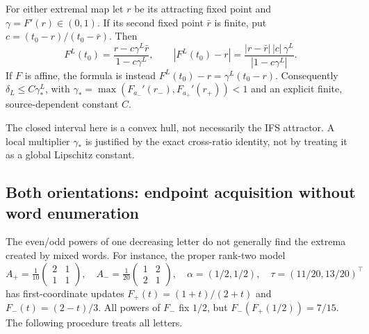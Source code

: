 \begin{corollary}
\label{II:U:cor:rank-two-cross-ratio}
For either extremal map let $r$ be its attracting fixed point and
$\gamma=F'(r)\in(0,1)$. If its second fixed point $\bar r$ is finite,
put $c=(t_0-r)/(t_0-\bar r)$. Then
\begin{equation}
 F^L(t_0)=\frac{r-c\gamma^L\bar r}{1-c\gamma^L},
 \qquad
 |F^L(t_0)-r|
 =\frac{|r-\bar r|\,|c|\,\gamma^L}{|1-c\gamma^L|}.
 \label{II:U:eq:rank-two-cross-ratio}
\end{equation}
If $F$ is affine, the formula is instead
$F^L(t_0)-r=\gamma^L(t_0-r)$.
Consequently $\delta_L\le C\gamma_*^L$, with
$\gamma_*=\max(F_{a_-}'(r_-),F_{a_+}'(r_+))<1$
and an explicit finite, source-dependent constant $C$.
\end{corollary}

The closed interval here is a convex hull, not necessarily the IFS
attractor. A local multiplier $\gamma_*$ is justified by the exact
cross-ratio identity, not by treating it as a global Lipschitz constant.

\subsection{Both orientations: endpoint acquisition without word enumeration}
\label{II:U:sec:rank-two-envelope}
The even/odd powers of one decreasing letter do not generally find the
extrema created by mixed words. For instance, the proper rank-two model
\[
 A_+=\tfrac1{10}\begin{pmatrix}2&1\\1&1\end{pmatrix},\quad
 A_-=\tfrac1{20}\begin{pmatrix}1&2\\2&1\end{pmatrix},\quad
 \alpha=(1/2,1/2),\quad \tau=(11/20,13/20)^\top
\]
has first-coordinate updates
$F_+(t)=(1+t)/(2+t)$ and $F_-(t)=(2-t)/3$.
All powers of $F_-$ fix $1/2$, but
$F_-(F_+(1/2))=7/15$. The following procedure treats all letters.

